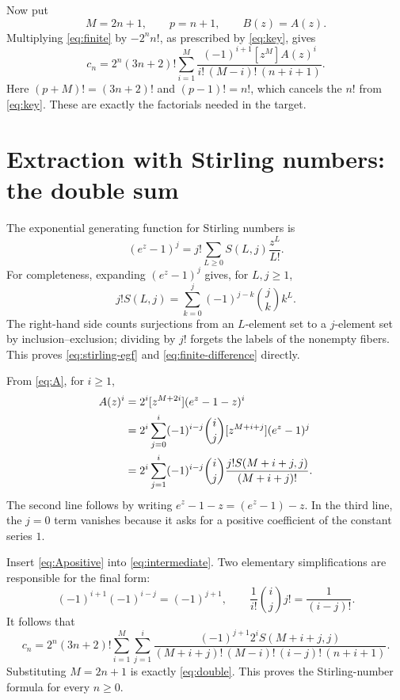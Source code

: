\documentclass[11pt,letterpaper]{article}
\numberwithin{equation}{section}
\theoremstyle{remark}
\begin{document}
Now put
\begin{equation}
 M=2n+1,\qquad p=n+1,\qquad B(z)=A(z).
 \label{eq:specialization}
\end{equation}
Multiplying \eqref{eq:finite} by $-2^n n!$, as prescribed by
\eqref{eq:key}, gives
\begin{equation}
 c_n=2^n(3n+2)!
 \sum_{i=1}^{M}
 \frac{(-1)^{i+1}[z^M]A(z)^i}
      {i!\,(M-i)!\,(n+i+1)}.
 \label{eq:intermediate}
\end{equation}
Here $(p+M)!=(3n+2)!$ and $(p-1)!=n!$, which cancels the $n!$
from \eqref{eq:key}. These are exactly the factorials needed in the target.

\section{Extraction with Stirling numbers: the double sum}
\label{sec:double}

The exponential generating function for Stirling numbers is
\begin{equation}
 (e^z-1)^j=j!\sum_{L\geq0}S(L,j)\frac{z^L}{L!}.
 \label{eq:stirling-egf}
\end{equation}
For completeness, expanding $(e^z-1)^j$ gives, for $L,j\geq1$,
\begin{equation}
 j!S(L,j)=\sum_{k=0}^{j}(-1)^{j-k}\binom jk k^L.
 \label{eq:finite-difference}
\end{equation}
The right-hand side counts surjections from an $L$-element set to a
$j$-element set by inclusion--exclusion; dividing by $j!$ forgets the
labels of the nonempty fibers. This proves \eqref{eq:stirling-egf} and
\eqref{eq:finite-difference} directly.

From \eqref{eq:A}, for $i\geq1$,
\begin{align}
 [z^M]A(z)^i
 &=2^i[z^{M+2i}](e^z-1-z)^i \notag\\
 &=2^i\sum_{j=0}^{i}(-1)^{i-j}\binom ij
          [z^{M+i+j}](e^z-1)^j \notag\\
 &=2^i\sum_{j=1}^{i}(-1)^{i-j}\binom ij
          \frac{j!S(M+i+j,j)}{(M+i+j)!}.
 \label{eq:Apositive}
\end{align}
The second line follows by writing $e^z-1-z=(e^z-1)-z$.
In the third line, the $j=0$ term vanishes because it asks for a positive
coefficient of the constant series $1$.

Insert \eqref{eq:Apositive} into \eqref{eq:intermediate}. Two elementary
simplifications are responsible for the final form:
\[
 (-1)^{i+1}(-1)^{i-j}=(-1)^{j+1},
 \qquad
 \frac1{i!}\binom ij j!=\frac1{(i-j)!}.
\]
It follows that
\begin{equation}
 c_n=2^n(3n+2)!
 \sum_{i=1}^{M}\sum_{j=1}^{i}
 \frac{(-1)^{j+1}2^i S(M+i+j,j)}
      {(M+i+j)!\,(M-i)!\,(i-j)!\,(n+i+1)}.
 \label{eq:double-M}
\end{equation}
Substituting $M=2n+1$ is exactly \eqref{eq:double}. This proves the
Stirling-number formula for every $n\geq0$.
\end{document}
